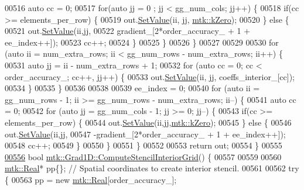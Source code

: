 \begin{DoxyCode}
{{00516     \textcolor{keyword}{auto} cc = 0;
00517     \textcolor{keywordflow}{for}(\textcolor{keyword}{auto} jj = 0 ; jj < gg\_num\_cols; jj++) \{
00518       \textcolor{keywordflow}{if}(cc >= elements\_per\_row) \{
00519         out.\hyperlink{classmtk_1_1DenseMatrix_a784ce5784109ac86bfb9d8562b334b13}{SetValue}(ii, jj, \hyperlink{group__c01-roots_ga59a451a5fae30d59649bcda274fea271}{mtk::kZero});
00520       \} \textcolor{keywordflow}{else} \{
00521         out.\hyperlink{classmtk_1_1DenseMatrix_a784ce5784109ac86bfb9d8562b334b13}{SetValue}(ii,jj,
00522                      gradient\_[2*order\_accuracy\_ + 1 + ee\_index++]);
00523         cc++;
00524       \}
00525     \}
00526   \}
00527 
00529 
00530   \textcolor{keywordflow}{for} (\textcolor{keyword}{auto} ii = num\_extra\_rows; ii < gg\_num\_rows - num\_extra\_rows; ii++) \{
00531     \textcolor{keyword}{auto} jj = ii - num\_extra\_rows + 1;
00532     \textcolor{keywordflow}{for} (\textcolor{keyword}{auto} cc = 0; cc < order\_accuracy\_; cc++, jj++) \{
00533       out.\hyperlink{classmtk_1_1DenseMatrix_a784ce5784109ac86bfb9d8562b334b13}{SetValue}(ii, jj, coeffs\_interior\_[cc]);
00534     \}
00535   \}
00536 
00538 
00539   ee\_index = 0;
00540   \textcolor{keywordflow}{for} (\textcolor{keyword}{auto} ii = gg\_num\_rows - 1; ii >= gg\_num\_rows - num\_extra\_rows; ii--) \{
00541     \textcolor{keyword}{auto} cc = 0;
00542     \textcolor{keywordflow}{for} (\textcolor{keyword}{auto} jj = gg\_num\_cols - 1; jj >= 0; jj--) \{
00543       \textcolor{keywordflow}{if}(cc >= elements\_per\_row) \{
00544         out.\hyperlink{classmtk_1_1DenseMatrix_a784ce5784109ac86bfb9d8562b334b13}{SetValue}(ii,jj,\hyperlink{group__c01-roots_ga59a451a5fae30d59649bcda274fea271}{mtk::kZero});
00545       \} \textcolor{keywordflow}{else} \{
00546         out.\hyperlink{classmtk_1_1DenseMatrix_a784ce5784109ac86bfb9d8562b334b13}{SetValue}(ii,jj,
00547                      -gradient\_[2*order\_accuracy\_ + 1 + ee\_index++]);
00548         cc++;
00549       \}
00550      \}
00551   \}
00552 
00553   \textcolor{keywordflow}{return} out;
00554 \}
00555 
\hypertarget{mtk__grad__1d_8cc_source_l00556}{}\hyperlink{classmtk_1_1Grad1D_ad6df25cc9dfc85ff8562ae3605486976}{00556} \textcolor{keywordtype}{bool} \hyperlink{classmtk_1_1Grad1D_ad6df25cc9dfc85ff8562ae3605486976}{mtk::Grad1D::ComputeStencilInteriorGrid}() \{
00557 
00559 
00560   \hyperlink{group__c01-roots_gac080bbbf5cbb5502c9f00405f894857d}{mtk::Real}* pp\{\}; \textcolor{comment}{// Spatial coordinates to create interior stencil.}
00561 
00562   \textcolor{keywordflow}{try} \{
00563     pp = \textcolor{keyword}{new} \hyperlink{group__c01-roots_gac080bbbf5cbb5502c9f00405f894857d}{mtk::Real}[order\_accuracy\_];
}}
\end{DoxyCode}

